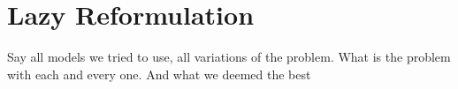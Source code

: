 
\section{Lazy Reformulation}
Say all models we tried to use, all variations of the problem. What is the problem with each and every one. And what we deemed the best
